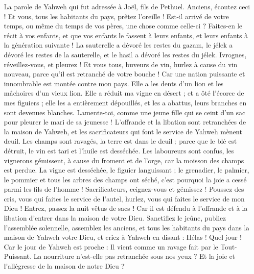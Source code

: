 \begin{multicols}{2}
\VerseOne{}La parole de Yahweh qui fut adressée à Joël, fils de Pethuel.
Anciens, écoutez ceci ! Et vous, tous les habitants du pays, prêtez l'oreille ! Est-il arrivé de votre temps, ou même du temps de vos pères, une chose comme celle-ci ?
Faites-en le récit à vos enfants, et que vos enfants le fassent à leurs enfants, et leurs enfants à la génération suivante !
La sauterelle a dévoré les restes du gazam, le jélek a dévoré les restes de la sauterelle, et le hasil a dévoré les restes du jélek.
Ivrognes, réveillez-vous, et pleurez ! Et vous tous, buveurs de vin, hurlez à cause du vin nouveau, parce qu'il est retranché de votre bouche !
Car une nation puissante et innombrable est montée contre mon pays. Elle a les dents d'un lion et les mâchoires d'un vieux lion.
Elle a réduit ma vigne en désert ; et a ôté l'écorce de mes figuiers ; elle les a entièrement dépouillés, et les a abattus, leurs branches en sont devenues blanches.
Lamente-toi, comme une jeune fille qui se ceint d'un sac pour pleurer le mari de sa jeunesse !
L'offrande et la libation sont retranchées de la maison de Yahweh, et les sacrificateurs qui font le service de Yahweh mènent deuil.
Les champs sont ravagés, la terre est dans le deuil ; parce que le blé est détruit, le vin est tari et l'huile est desséchée.
Les laboureurs sont confus, les vignerons gémissent, à cause du froment et de l'orge, car la moisson des champs est perdue.
La vigne est desséchée, le figuier languissant ; le grenadier, le palmier, le pommier et tous les arbres des champs ont séché, c'est pourquoi la joie a cessé parmi les fils de l'homme !
Sacrificateurs, ceignez-vous et gémissez ! Poussez des cris, vous qui faites le service de l'autel, hurlez, vous qui faites le service de mon Dieu ! Entrez, passez la nuit vêtus de sacs ! Car il est défendu à l'offrande et à la libation d'entrer dans la maison de votre Dieu.
Sanctifiez le jeûne, publiez l'assemblée solennelle, assemblez les anciens, et tous les habitants du pays dans la maison de Yahweh votre Dieu, et criez à Yahweh en disant :
Hélas ! Quel jour ! Car le jour de Yahweh est proche : Il vient comme un ravage fait par le Tout-Puissant.
La nourriture n'est-elle pas retranchée sous nos yeux ? Et la joie et l'allégresse de la maison de notre Dieu ?

\end{multicols}
